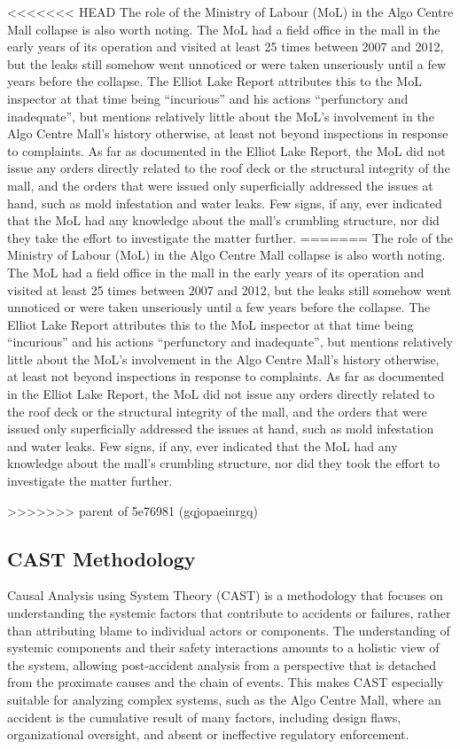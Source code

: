 \documentclass[12pt]{article}
\begin{document}
<<<<<<< HEAD
The role of the Ministry of Labour (MoL) in the Algo Centre Mall collapse is also worth noting. The MoL had a field office in the mall in the early years of its operation and visited at least 25 times between 2007 and 2012, but the leaks still somehow went unnoticed or were taken unseriously until a few years before the collapse. The Elliot Lake Report attributes this to the MoL inspector at that time being ``incurious'' and his actions ``perfunctory and inadequate'', but mentions relatively little about the MoL's involvement in the Algo Centre Mall's history otherwise, at least not beyond inspections in response to complaints. As far as documented in the Elliot Lake Report, the MoL did not issue any orders directly related to the roof deck or the structural integrity of the mall, and the orders that were issued only superficially addressed the issues at hand, such as mold infestation and water leaks. Few signs, if any, ever indicated that the MoL had any knowledge about the mall's crumbling structure, nor did they take the effort to investigate the matter further. 
=======
The role of the Ministry of Labour (MoL) in the Algo Centre Mall collapse is also worth noting. The MoL had a field office in the mall in the early years of its operation and visited at least 25 times between 2007 and 2012, but the leaks still somehow went unnoticed or were taken unseriously until a few years before the collapse. The Elliot Lake Report attributes this to the MoL inspector at that time being ``incurious'' and his actions ``perfunctory and inadequate'', but mentions relatively little about the MoL's involvement in the Algo Centre Mall's history otherwise, at least not beyond inspections in response to complaints. As far as documented in the Elliot Lake Report, the MoL did not issue any orders directly related to the roof deck or the structural integrity of the mall, and the orders that were issued only superficially addressed the issues at hand, such as mold infestation and water leaks. Few signs, if any, ever indicated that the MoL had any knowledge about the mall's crumbling structure, nor did they took the effort to investigate the matter further. 

>>>>>>> parent of 5e76981 (gqjopaeinrgq)

\subsection{CAST Methodology}

Causal Analysis using System Theory (CAST) is a methodology that focuses on understanding the systemic factors that contribute to accidents or failures, rather than attributing blame to individual actors or components. The understanding of systemic components and their safety interactions amounts to a holistic view of the system, allowing post-accident analysis from a perspective that is detached from the proximate causes and the chain of events. This makes CAST especially suitable for analyzing complex systems, such as the Algo Centre Mall, where an accident is the cumulative result of many factors, including design flaws, organizational oversight, and absent or ineffective regulatory enforcement.
\end{document}

